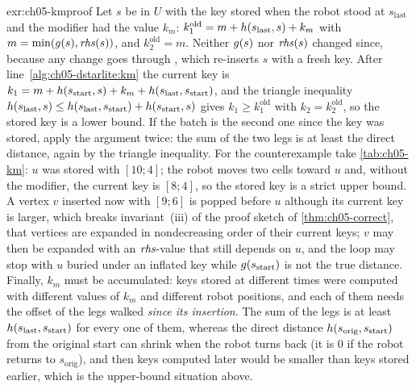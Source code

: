 \begin{solution}{exr:ch05-kmproof}
Let $s$ be in $U$ with the key stored when the robot stood at $s_{\mathrm{last}}$ and the modifier had the value $k_m$: $k_1^{\mathrm{old}}=m+h(s_{\mathrm{last}},s)+k_m$ with $m=\min(g(s),\mathit{rhs}(s))$, and $k_2^{\mathrm{old}}=m$. Neither $g(s)$ nor $\mathit{rhs}(s)$ changed since, because any change goes through \DslUpdateVertex, which re-inserts $s$ with a fresh key. After line~\ref{alg:ch05-dstarlite:km} the current key is $k_1=m+h(s_{\mathrm{start}},s)+k_m+h(s_{\mathrm{last}},s_{\mathrm{start}})$, and the triangle inequality $h(s_{\mathrm{last}},s)\le h(s_{\mathrm{last}},s_{\mathrm{start}})+h(s_{\mathrm{start}},s)$ gives $k_1\ge k_1^{\mathrm{old}}$ with $k_2=k_2^{\mathrm{old}}$, so the stored key is a lower bound. If the batch is the second one since the key was stored, apply the argument twice: the sum of the two legs is at least the direct distance, again by the triangle inequality. For the counterexample take \cref{tab:ch05-km}: $u$ was stored with $[10;4]$; the robot moves two cells toward $u$ and, without the modifier, the current key is $[8;4]$, so the stored key is a strict upper bound. A vertex $v$ inserted now with $[9;6]$ is popped before $u$ although its current key is larger, which breaks invariant~(iii) of the proof sketch of \cref{thm:ch05-correct}, that vertices are expanded in nondecreasing order of their current keys; $v$ may then be expanded with an $\mathit{rhs}$-value that still depends on $u$, and the loop may stop with $u$ buried under an inflated key while $g(s_{\mathrm{start}})$ is not the true distance. Finally, $k_m$ must be accumulated: keys stored at different times were computed with different values of $k_m$ and different robot positions, and each of them needs the offset of the legs walked \emph{since its insertion}. The sum of the legs is at least $h(s_{\mathrm{last}},s_{\mathrm{start}})$ for every one of them, whereas the direct distance $h(s_{\mathrm{orig}},s_{\mathrm{start}})$ from the original start can shrink when the robot turns back (it is $0$ if the robot returns to $s_{\mathrm{orig}}$), and then keys computed later would be smaller than keys stored earlier, which is the upper-bound situation above.
\end{solution}

